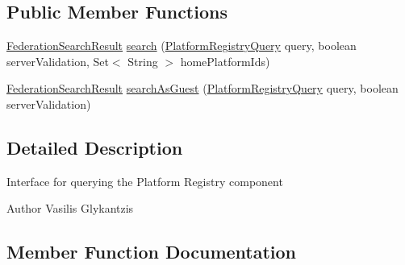 \subsection*{Public Member Functions}
\begin{DoxyCompactItemize}
\item 
\hyperlink{classeu_1_1h2020_1_1symbiote_1_1cloud_1_1model_1_1internal_1_1FederationSearchResult}{Federation\+Search\+Result} \hyperlink{interfaceeu_1_1h2020_1_1symbiote_1_1client_1_1interfaces_1_1PRClient_abe1df516298dbd8109fa668dc7a58f60}{search} (\hyperlink{classeu_1_1h2020_1_1symbiote_1_1cloud_1_1model_1_1internal_1_1PlatformRegistryQuery}{Platform\+Registry\+Query} query, boolean server\+Validation, Set$<$ String $>$ home\+Platform\+Ids)
\item 
\hyperlink{classeu_1_1h2020_1_1symbiote_1_1cloud_1_1model_1_1internal_1_1FederationSearchResult}{Federation\+Search\+Result} \hyperlink{interfaceeu_1_1h2020_1_1symbiote_1_1client_1_1interfaces_1_1PRClient_a74bab2b341b6e1086c0b88e01e1e00f7}{search\+As\+Guest} (\hyperlink{classeu_1_1h2020_1_1symbiote_1_1cloud_1_1model_1_1internal_1_1PlatformRegistryQuery}{Platform\+Registry\+Query} query, boolean server\+Validation)
\end{DoxyCompactItemize}


\subsection{Detailed Description}
Interface for querying the Platform Registry component

\begin{DoxyAuthor}{Author}
Vasilis Glykantzis 
\end{DoxyAuthor}


\subsection{Member Function Documentation}
\mbox{\label{interfaceeu_1_1h2020_1_1symbiote_1_1client_1_1interfaces_1_1PRClient_abe1df516298dbd8109fa668dc7a58f60}} 
